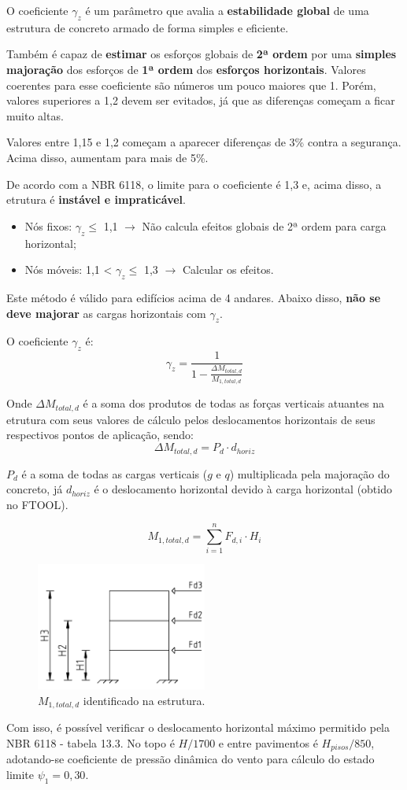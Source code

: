 O coeficiente $\gamma_z$ é um parâmetro que avalia a \textbf{estabilidade global} de uma estrutura de concreto armado de forma simples e eficiente.

Também é capaz de \textbf{estimar} os esforços globais de \textbf{2ª ordem} por uma \textbf{simples majoração} dos esforços de \textbf{1ª ordem} dos \textbf{esforços horizontais}. Valores coerentes para esse coeficiente são números um pouco maiores que 1. Porém, valores superiores a 1,2 devem ser evitados, já que as diferenças começam a ficar muito altas.

Valores entre 1,15 e 1,2 começam a aparecer diferenças de 3\% contra a segurança. Acima disso, aumentam para mais de 5\%.

De acordo com a NBR 6118, o limite para o coeficiente é 1,3 e, acima disso, a etrutura é \textbf{instável e impraticável}.

\begin{itemize}
	\item Nós fixos: $\gamma_z\leqslant$ 1,1 $\rightarrow$ Não calcula efeitos globais de 2ª ordem para carga horizontal;
	\item Nós móveis: 1,1 < $\gamma_z\leqslant$ 1,3 $\rightarrow$ Calcular os efeitos. 
\end{itemize}

Este método é válido para edifícios acima de 4 andares. Abaixo disso, \textbf{não se deve majorar} as cargas horizontais com $\gamma_z$.

O coeficiente $\gamma_z$ é: $$\gamma_z=\frac{1}{1-\frac{\Delta M_{total, d}}{M_{1, total, d}}}$$

Onde $\Delta M_{total, d}$ é a soma dos produtos de todas as forças verticais atuantes na etrutura com seus valores de cálculo pelos deslocamentos horizontais de seus respectivos pontos de aplicação, sendo: $$\Delta M_{total, d}=P_d\cdot d_{horiz}$$

$P_d$ é a soma de todas as cargas verticais ($g$ e $q$) multiplicada pela majoração do concreto, já $d_{horiz}$ é o deslocamento horizontal devido à carga horizontal (obtido no FTOOL).

$$M_{1, total, d}=\sum_{i=1}^{n} F_{d, i}\cdot H_i$$

\begin{figure}[H]
	\begin{center}
	\caption{$M_{1, total, d}$ identificado na estrutura.}
    	\includegraphics[width=0.5\textwidth]{Coeficiente-gamma-z/Imagens/M1-total-d.png}
	\end{center}
\end{figure}

Com isso, é possível verificar o deslocamento horizontal máximo permitido pela NBR 6118 - tabela 13.3. No topo é $H/1700$ e entre pavimentos é $H_{pisos}/850$, adotando-se coeficiente de pressão dinâmica do vento para cálculo do estado limite $\psi_1=0,30$.